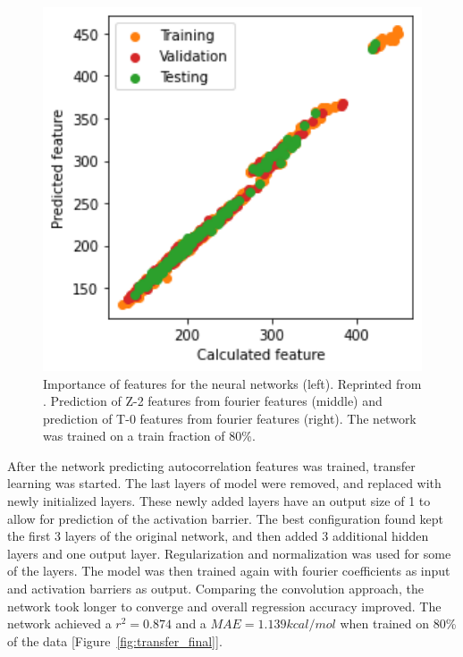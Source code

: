 \begin{figure}[h]
      \includegraphics[width=1.0\textwidth]{figures/regression/fourier/transfer/scatterT0.png}
    \endminipage
    \caption[Prediction of autocorrelation features from LEFD]{
    Importance of features for the neural networks (left). Reprinted from \cite{friederich_dos}.
    Prediction of Z-2 features from fourier features (middle) and prediction of T-0 features from fourier features (right). 
    The network was trained on a train fraction of 80\%.
    }
    \label{fig:transfer_result}
\end{figure}

After the network predicting autocorrelation features was trained, transfer learning was started.
The last layers of model were removed, and replaced with newly initialized layers.
These newly added layers have an output size of 1 to allow for prediction of the activation barrier.
The best configuration found kept the first 3 layers of the original network, and then added 3 additional hidden layers and one output layer.
Regularization and normalization was used for some of the layers.
The model was then trained again with fourier coefficients as input and activation barriers as output.
Comparing the convolution approach, the network took longer to converge and overall regression accuracy improved.
The network achieved a $r^2=0.874$ and a $MAE=1.139 kcal/mol$ when trained on 80\% of the data [Figure~\ref{fig:transfer_final}].


